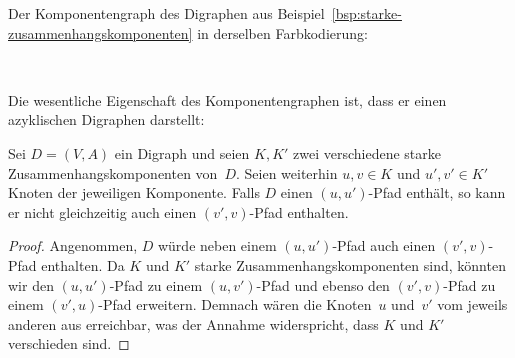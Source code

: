 \begin{bsp}
\label{bsp:komponentengraph}
Der Komponentengraph des Digraphen aus Beispiel~\ref{bsp:starke-zusammenhangskomponenten} in derselben Farbkodierung:

\hfill
{}
\hfill\,
\end{bsp}

\begin{bem}
Die wesentliche Eigenschaft des Komponentengraphen ist, dass er einen azyklischen Digraphen darstellt:
\end{bem} 

\begin{lem}
\label{lem:komponentengraph-azyklisch}
Sei $D=(V,A)$ ein Digraph und seien $K,K'$ zwei verschiedene starke Zusammenhangskomponenten von~$D$.
Seien weiterhin $u,v \in K$ und $u',v' \in K'$ Knoten der jeweiligen Komponente.
Falls $D$ einen $(u,u')$-Pfad enthält, so kann er nicht gleichzeitig auch einen $(v',v)$-Pfad enthalten.
\end{lem}

\begin{proof}
Angenommen, $D$ würde neben einem $(u,u')$-Pfad auch einen $(v',v)$-Pfad enthalten.
Da $K$ und $K'$ starke Zusammenhangskomponenten sind, könnten wir den $(u,u')$-Pfad zu einem $(u,v')$-Pfad und ebenso den $(v',v)$-Pfad zu einem $(v',u)$-Pfad erweitern.
Demnach wären die Knoten~$u$ und~$v'$ vom jeweils anderen aus erreichbar, was der Annahme widerspricht, dass $K$ und $K'$ verschieden sind.
\end{proof}

